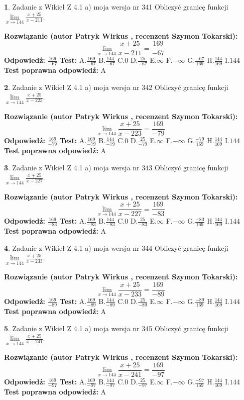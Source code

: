 \documentclass[12pt, a4paper]{article}
\theoremstyle{definition} %
\newtheorem{zad}{}
\newcommand{\zadStart}[1]{\begin{zad}#1\newline}
\newcommand{\zadStop}{\end{zad}}
\newcommand{\rozwStart}[2]{\noindent \textbf{Rozwiązanie (autor #1 , recenzent #2): }\newline}
\newcommand{\rozwStop}{\newline}
\newcommand{\odpStart}{\noindent \textbf{Odpowiedź:}\newline}
\newcommand{\odpStop}{\newline}
\newcommand{\testStart}{\noindent \textbf{Test:}\newline}
\newcommand{\testStop}{\newline}
\newcommand{\kluczStart}{\noindent \textbf{Test poprawna odpowiedź:}\newline}
\newcommand{\kluczStop}{\newline}
\begin{document}
\zadStart{Zadanie z Wikieł Z 4.1 a) moja wersja nr 341}
Obliczyć granicę funkcji $\lim\limits_{x\to144}\frac{x+25}{x-211}$.
\zadStop
\rozwStart{Patryk Wirkus}{Szymon Tokarski}
$$\lim\limits_{x\to144}\frac{x+25}{x-211} = \frac{169}{-67}$$
\rozwStop
\odpStart
$\frac{169}{-67}$
\odpStop
\testStart
A.$\frac{169}{-67}$
B.$\frac{144}{-67}$
C.$0$
D.$\frac{25}{-67}$
E.$\infty$
F.$-\infty$
G.$\frac{-67}{169}$
H.$\frac{144}{169}$
I.$144$
\testStop
\kluczStart
A
\kluczStop



\zadStart{Zadanie z Wikieł Z 4.1 a) moja wersja nr 342}
Obliczyć granicę funkcji $\lim\limits_{x\to144}\frac{x+25}{x-223}$.
\zadStop
\rozwStart{Patryk Wirkus}{Szymon Tokarski}
$$\lim\limits_{x\to144}\frac{x+25}{x-223} = \frac{169}{-79}$$
\rozwStop
\odpStart
$\frac{169}{-79}$
\odpStop
\testStart
A.$\frac{169}{-79}$
B.$\frac{144}{-79}$
C.$0$
D.$\frac{25}{-79}$
E.$\infty$
F.$-\infty$
G.$\frac{-79}{169}$
H.$\frac{144}{169}$
I.$144$
\testStop
\kluczStart
A
\kluczStop



\zadStart{Zadanie z Wikieł Z 4.1 a) moja wersja nr 343}
Obliczyć granicę funkcji $\lim\limits_{x\to144}\frac{x+25}{x-227}$.
\zadStop
\rozwStart{Patryk Wirkus}{Szymon Tokarski}
$$\lim\limits_{x\to144}\frac{x+25}{x-227} = \frac{169}{-83}$$
\rozwStop
\odpStart
$\frac{169}{-83}$
\odpStop
\testStart
A.$\frac{169}{-83}$
B.$\frac{144}{-83}$
C.$0$
D.$\frac{25}{-83}$
E.$\infty$
F.$-\infty$
G.$\frac{-83}{169}$
H.$\frac{144}{169}$
I.$144$
\testStop
\kluczStart
A
\kluczStop



\zadStart{Zadanie z Wikieł Z 4.1 a) moja wersja nr 344}
Obliczyć granicę funkcji $\lim\limits_{x\to144}\frac{x+25}{x-233}$.
\zadStop
\rozwStart{Patryk Wirkus}{Szymon Tokarski}
$$\lim\limits_{x\to144}\frac{x+25}{x-233} = \frac{169}{-89}$$
\rozwStop
\odpStart
$\frac{169}{-89}$
\odpStop
\testStart
A.$\frac{169}{-89}$
B.$\frac{144}{-89}$
C.$0$
D.$\frac{25}{-89}$
E.$\infty$
F.$-\infty$
G.$\frac{-89}{169}$
H.$\frac{144}{169}$
I.$144$
\testStop
\kluczStart
A
\kluczStop



\zadStart{Zadanie z Wikieł Z 4.1 a) moja wersja nr 345}
Obliczyć granicę funkcji $\lim\limits_{x\to144}\frac{x+25}{x-241}$.
\zadStop
\rozwStart{Patryk Wirkus}{Szymon Tokarski}
$$\lim\limits_{x\to144}\frac{x+25}{x-241} = \frac{169}{-97}$$
\rozwStop
\odpStart
$\frac{169}{-97}$
\odpStop
\testStart
A.$\frac{169}{-97}$
B.$\frac{144}{-97}$
C.$0$
D.$\frac{25}{-97}$
E.$\infty$
F.$-\infty$
G.$\frac{-97}{169}$
H.$\frac{144}{169}$
I.$144$
\testStop
\kluczStart
A
\kluczStop
\end{document}
